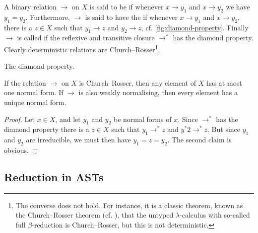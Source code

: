 A binary relation $\to$ on $X$ is said to be  if whenever $x \to y_1$ and $x \to y_2$ we have $y_1 = y_2$. Furthermore, $\to$ is said to have the  if whenever $x \to y_1$ and $x \to y_2$, there is a $z \in X$ such that $y_1 \to z$ and $y_2 \to z$, cf. \cref{fig:diamond-property}. Finally $\to$ is called  if the reflexive and transitive closure $\to^*$ has the diamond property. Clearly deterministic relations are Church--Rosser\footnote{The converse does not hold. For instance, it is a classic theorem, known as the Church--Rosser theorem (cf. \cite[Theorem~3.2.8]{barendregt-lambda}), that the untyped $\lambda$-calculus with so-called full $\beta$-reduction is Church--Rosser, but this is not deterministic.}.

\begin{marginfigure}\small
    \caption{The diamond property.}
    \label{fig:diamond-property}
\end{marginfigure}

\begin{lemma}
    \label{lem:normal-form-uniqueness}
    If the relation $\to$ on $X$ is Church--Rosser, then any element of $X$ has at most one normal form. If $\to$ is also weakly normalising, then every element has a unique normal form.
\end{lemma}

\begin{proof}
    Let $x \in X$, and let $y_1$ and $y_2$ be normal forms of $x$. Since $\to^*$ has the diamond property there is a $z \in X$ such that $y_1 \to^* z$ and $y^*2 \to^* z$. But since $y_1$ and $y_2$ are irreducible, we must then have $y_1 = z = y_2$. The second claim is obvious.
\end{proof}


\subsection{Reduction in ASTs}\label{sec:reduction-in-ASTs}

